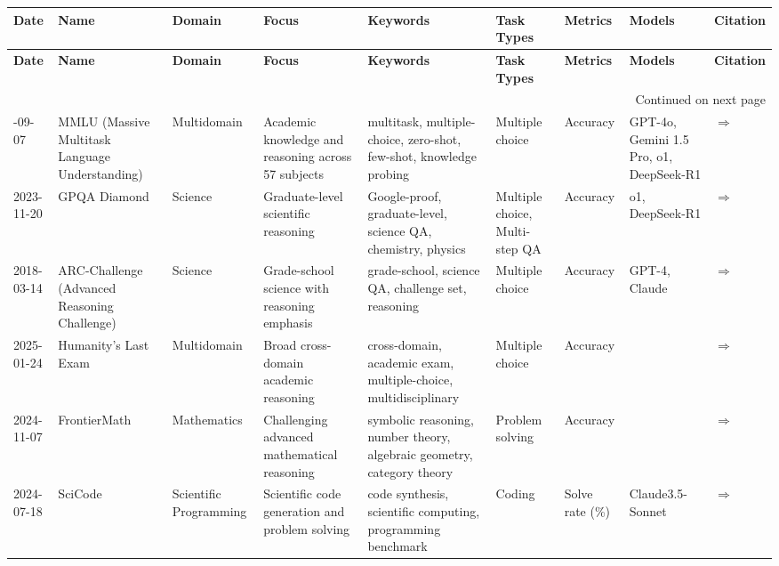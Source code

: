 
        \begin{landscape}
        \footnotesize

\begin{longtable}{|p{2cm}|p{2cm}|p{2cm}|p{2cm}|p{2cm}|p{2cm}|p{2cm}|p{2cm}|p{2cm}|}
\hline
\textbf{Date} & \textbf{Name} & \textbf{Domain} & \textbf{Focus} & \textbf{Keywords} & \textbf{Task Types} & \textbf{Metrics} & \textbf{Models} & \textbf{Citation} \\ \hline
\endfirsthead
\hline
\textbf{Date} & \textbf{Name} & \textbf{Domain} & \textbf{Focus} & \textbf{Keywords} & \textbf{Task Types} & \textbf{Metrics} & \textbf{Models} & \textbf{Citation} \\ \hline
\endhead
\hline
\multicolumn{9}{r}{Continued on next page} \\
\endfoot
\hline
\endlastfoot
2020-09-07 & MMLU (Massive Multitask Language Understanding) & Multidomain & Academic knowledge and reasoning across 57 subjects & multitask, multiple-choice, zero-shot, few-shot, knowledge probing & Multiple choice & Accuracy & GPT-4o, Gemini 1.5 Pro, o1, DeepSeek-R1 & \cite{hendrycks2021measuring}\href{https://paperswithcode.com/dataset/mmlu}{$\Rightarrow$} \\ \hline
2023-11-20 & GPQA Diamond & Science & Graduate-level scientific reasoning & Google-proof, graduate-level, science QA, chemistry, physics & Multiple choice, Multi-step QA & Accuracy & o1, DeepSeek-R1 & \cite{rein2023gpqagraduatelevelgoogleproofqa}\href{https://arxiv.org/abs/2311.12022}{$\Rightarrow$} \\ \hline
2018-03-14 & ARC-Challenge (Advanced Reasoning Challenge) & Science & Grade-school science with reasoning emphasis & grade-school, science QA, challenge set, reasoning & Multiple choice & Accuracy & GPT-4, Claude & \cite{clark2018think}\href{https://allenai.org/data/arc}{$\Rightarrow$} \\ \hline
2025-01-24 & Humanity's Last Exam & Multidomain & Broad cross-domain academic reasoning & cross-domain, academic exam, multiple-choice, multidisciplinary & Multiple choice & Accuracy &  & \cite{phan2025humanitys}\href{https://arxiv.org/abs/2501.14249}{$\Rightarrow$} \\ \hline
2024-11-07 & FrontierMath & Mathematics & Challenging advanced mathematical reasoning & symbolic reasoning, number theory, algebraic geometry, category theory & Problem solving & Accuracy &  & \cite{glazer2024frontiermath}\href{https://arxiv.org/abs/2411.04872}{$\Rightarrow$} \\ \hline
2024-07-18 & SciCode & Scientific Programming & Scientific code generation and problem solving & code synthesis, scientific computing, programming benchmark & Coding & Solve rate (\%) & Claude3.5-Sonnet & \cite{tian2024scicode}\href{https://arxiv.org/abs/2407.13168}{$\Rightarrow$} \\ \hline

\end{longtable}
\end{landscape}
